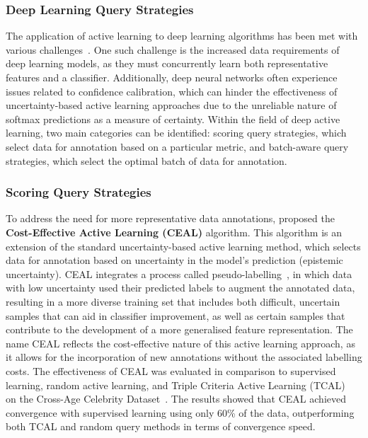 \subsubsection{Deep Learning Query Strategies}
The application of active learning to deep learning algorithms has been met with various challenges~\citep{ren2021survey}. One such challenge is the increased data requirements of deep learning models, as they must concurrently learn both representative features and a classifier. Additionally, deep neural networks often experience issues related to confidence calibration, which can hinder the effectiveness of uncertainty-based active learning approaches due to the unreliable nature of softmax predictions as a measure of certainty. Within the field of deep active learning, two main categories can be identified: scoring query strategies, which select data for annotation based on a particular metric, and batch-aware query strategies, which select the optimal batch of data for annotation.

\subsubsection{Scoring Query Strategies}
To address the need for more representative data annotations, \cite{wang2016cost} proposed the \textbf{Cost-Effective Active Learning (CEAL)} algorithm. This algorithm is an extension of the standard uncertainty-based active learning method, which selects data for annotation based on uncertainty in the model's prediction (epistemic uncertainty). CEAL integrates a process called pseudo-labelling~\citep{lee2013pseudo}, in which data with low uncertainty used their predicted labels to augment the annotated data, resulting in a more diverse training set that includes both difficult, uncertain samples that can aid in classifier improvement, as well as certain samples that contribute to the development of a more generalised feature representation. The name CEAL reflects the cost-effective nature of this active learning approach, as it allows for the incorporation of new annotations without the associated labelling costs. The effectiveness of CEAL was evaluated in comparison to supervised learning, random active learning, and Triple Criteria Active Learning (TCAL)~\citep{demir2014novel} on the Cross-Age Celebrity Dataset~\citep{chen2014cross}. The results showed that CEAL achieved convergence with supervised learning using only 60\% of the data, outperforming both TCAL and random query methods in terms of convergence speed.

